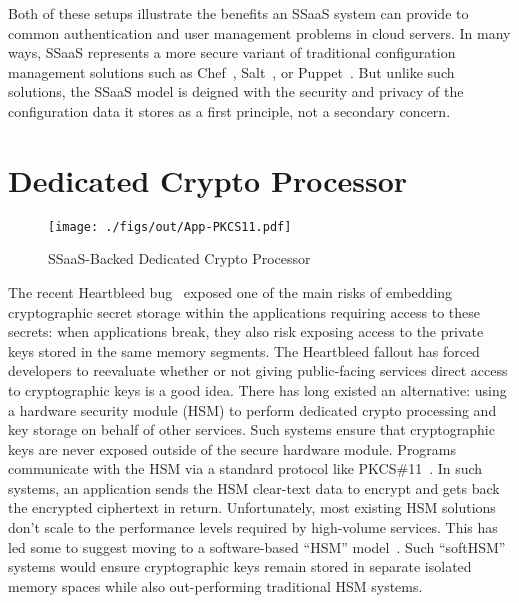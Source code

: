 Both of these setups illustrate the benefits an SSaaS system can
provide to common authentication and user management problems in cloud
servers. In many ways, SSaaS represents a more secure variant of
traditional configuration management solutions such as
Chef~\cite{chef}, Salt~\cite{salt}, or Puppet~\cite{puppet}. But
unlike such solutions, the SSaaS model is deigned with the security
and privacy of the configuration data it stores as a first principle,
not a secondary concern.

\section{Dedicated Crypto Processor}

\begin{figure}[t]
  \centering
  \texttt{[image: ./figs/out/App-PKCS11.pdf]}
  \caption{SSaaS-Backed Dedicated Crypto Processor}
  \label{fig:app-pkcs11}
\end{figure}

The recent Heartbleed bug~\cite{heartbleed} exposed one of the main
risks of embedding cryptographic secret storage within the
applications requiring access to these secrets: when applications
break, they also risk exposing access to the private keys stored in
the same memory segments. The Heartbleed fallout has forced developers
to reevaluate whether or not giving public-facing services direct
access to cryptographic keys is a good idea. There has long existed an
alternative: using a hardware security module (HSM) to perform
dedicated crypto processing and key storage on behalf of other
services. Such systems ensure that cryptographic keys are never
exposed outside of the secure hardware module. Programs communicate
with the HSM via a standard protocol like
PKCS\#11~\cite{pcks11-standard}. In such systems, an application sends
the HSM clear-text data to encrypt and gets back the encrypted
ciphertext in return. Unfortunately, most existing HSM solutions don't
scale to the performance levels required by high-volume services. This
has led some to suggest moving to a software-based ``HSM''
model~\cite{lorier-pkcs11}. Such ``softHSM'' systems would ensure
cryptographic keys remain stored in separate isolated memory spaces
while also out-performing traditional HSM systems.

